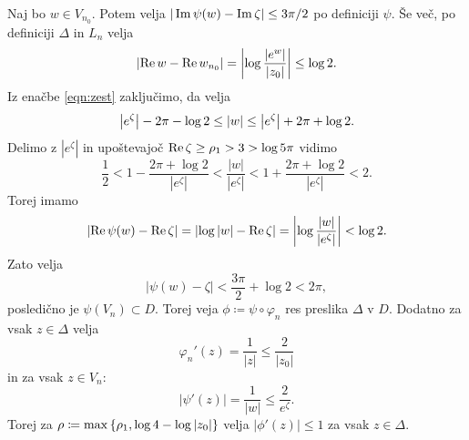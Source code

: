 \begin{dokaz}
    Naj bo \(w \in V_{n_0}\). Potem velja \(|\operatorname{Im} \psi (w) - \operatorname{Im} \zeta| \leq 3 \pi / 2\) po definiciji \(\psi\). Še več, po definiciji \(\Delta\) in \(L_n\) velja
    \[\left\lvert\operatorname{Re} w - \operatorname{Re} w_{n_0}\right\rvert = \left\lvert\log \frac{|e^w|}{|z_0|}\right\rvert \leq \log 2.\]
    Iz enačbe \eqref{eqn:zest} zaključimo, da velja
    \[\left\lvert e^{\zeta}\right\rvert - 2 \pi - \log 2 \leq |w| \leq \left\lvert e^{\zeta}\right\rvert + 2 \pi + \log 2.\]
    Delimo z \(|e^{\zeta}|\) in upoštevajoč \(\operatorname{Re} \zeta \geq \rho_1 > 3 > \log 5 \pi\) vidimo
    \[\frac{1}{2} < 1 - \frac{2 \pi + \log 2}{|e^{\zeta}|} < \frac{|w|}{|e^{\zeta}|} < 1 + \frac{2 \pi + \log 2}{|e^{\zeta}|} < 2.\]
    Torej imamo
    \[\left\lvert\operatorname{Re} \psi (w) - \operatorname{Re} \zeta\right\rvert = \left\lvert\log |w| - \operatorname{Re} \zeta\right\rvert = \left\lvert\log \frac{|w|}{|e^{\zeta}|}\right\rvert < \log 2.\]
    Zato velja
    \[|\psi (w) - \zeta| < \frac{3 \pi}{2} + \log 2 < 2 \pi,\]
    posledično je \(\psi (V_n) \subset D\). Torej veja \(\phi \coloneq \psi \circ \varphi_n\) res preslika \(\Delta\) v \(D\). Dodatno za vsak \(z \in \Delta\) velja
    \[\varphi_n' (z) = \frac{1}{|z|} \leq \frac{2}{|z_0|}\]
    in za vsak \(z \in V_n\):
    \[|\psi' (z)| = \frac{1}{|w|} \leq \frac{2}{e^{\zeta}}.\]
    Torej za \(\rho \coloneq \max \left\{ \rho_1, \log 4 - \log |z_0| \right\}\) velja \(|\phi' (z)| \leq 1\) za vsak \(z \in \Delta\).
\end{dokaz}

